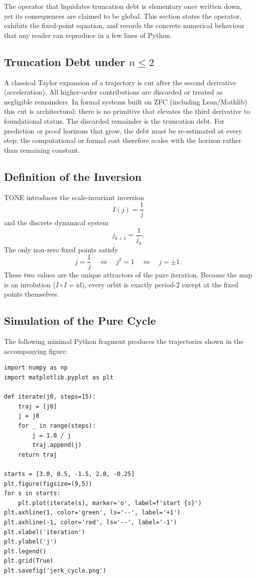 \documentclass[11pt,a4paper]{article}
\begin{document}
The operator that liquidates truncation debt is elementary once written down, yet its consequences are claimed to be global. This section states the operator, exhibits the fixed-point equation, and records the concrete numerical behaviour that any reader can reproduce in a few lines of Python.

\subsection{Truncation Debt under \texorpdfstring{$n \leq 2$}{n <= 2}}

A classical Taylor expansion of a trajectory is cut after the second derivative (acceleration). All higher-order contributions are discarded or treated as negligible remainders. In formal systems built on ZFC (including Lean/Mathlib) this cut is architectural: there is no primitive that elevates the third derivative to foundational status. The discarded remainder is the truncation debt. For prediction or proof horizons that grow, the debt must be re-estimated at every step; the computational or formal cost therefore scales with the horizon rather than remaining constant.

\subsection{Definition of the Inversion}

TONE introduces the scale-invariant inversion
\[
I(j)=\frac{1}{j}
\]
and the discrete dynamical system
\[
j_{k+1}=\frac{1}{j_k}.
\]
The only non-zero fixed points satisfy
\[
j=\frac{1}{j}\quad\Leftrightarrow\quad j^2=1\quad\Leftrightarrow\quad j=\pm 1.
\]
These two values are the unique attractors of the pure iteration. Because the map is an involution (\(I\circ I=\mathrm{id}\)), every orbit is exactly period-2 except at the fixed points themselves.

\subsection{Simulation of the Pure Cycle}

The following minimal Python fragment produces the trajectories shown in the accompanying figure:

\begin{lstlisting}
import numpy as np
import matplotlib.pyplot as plt

def iterate(j0, steps=15):
    traj = [j0]
    j = j0
    for _ in range(steps):
        j = 1.0 / j
        traj.append(j)
    return traj

starts = [3.0, 0.5, -1.5, 2.0, -0.25]
plt.figure(figsize=(9,5))
for s in starts:
    plt.plot(iterate(s), marker='o', label=f'start {s}')
plt.axhline(1, color='green', ls='--', label='+1')
plt.axhline(-1, color='red', ls='--', label='-1')
plt.xlabel('iteration')
plt.ylabel('j')
plt.legend()
plt.grid(True)
plt.savefig('jerk_cycle.png')
\end{lstlisting}
\end{document}
